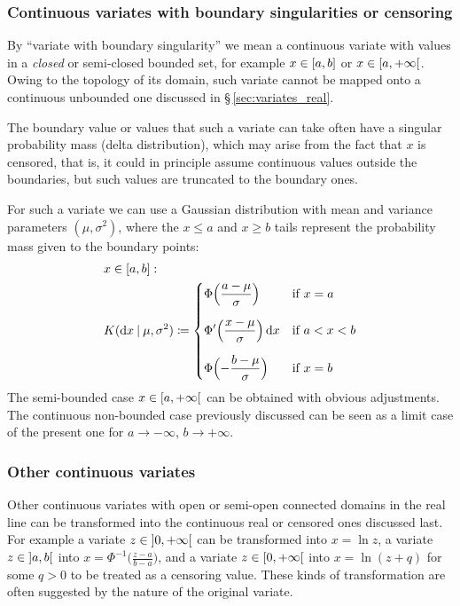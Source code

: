 \documentclass[\ifafour a4paper,12pt,\else a5paper,10pt,\fi%
onecolumn,oneside,article,%
british%
]{memoir}
\theoremstyle{remark}
\theoremstyle{innote}
\newcommand*{\di}{\mathrm{d}}%
\newcommand*{\defd}{\coloneqq}
\renewcommand*{\le}{\leqslant}%
\renewcommand*{\ge}{\geqslant}%
\DeclarePairedDelimiter\clcl{[}{]}
\DeclarePairedDelimiter\clop{[}{[}
\DeclarePairedDelimiter\opop{]}{[}%
\renewcommand*{\|}[1][]{\nonscript\:#1\vert\nonscript\:\mathopen{}}
\newcommand*{\sect}{\S}%
\begin{document}
\subsubsection{Continuous variates with boundary singularities or censoring}
\label{sec:variates_censored}

By \enquote{variate with boundary singularity} we mean a continuous variate with values in a \emph{closed} or semi-closed bounded set, for example $x \in \clcl{a,b}$ or $x \in \clop{a,+\infty}$. Owing to the topology of its domain, such variate cannot be mapped onto a continuous unbounded one discussed in \sect\,\ref{sec:variates_real}.

The boundary value or values that such a variate can take often have a singular probability mass (delta distribution), which may arise from the fact that $x$ is censored, that is, it could in principle assume continuous values outside the boundaries, but such values are truncated to the boundary ones.

For such a variate we can use a Gaussian distribution with mean and variance parameters $(\mu,\sigma^{2})$, where the $x \le a$ and $x \ge b$ tails represent the probability mass given to the boundary points:
\begin{equation}
  \begin{split}
    \label{eq:K_cens}
    &x \in \clcl{a,b}:
    \\
    &K(\di x \| \mu, \sigma^{2}) \defd
    \begin{dcases}
        \Phi\Bigl(
  \frac{a - \mu}{\sigma}
  \Bigr)
  &\text{if $x=a$}
      \\[2\jot]
        \Phi'\Bigl(
  \frac{x - \mu}{\sigma}
  \Bigr)
  \, \di x
  &\text{if $a < x < b$}
      \\[2\jot]
        \Phi\Bigl(
  -\frac{b - \mu}{\sigma}
  \Bigr)
  &\text{if $x=b$}
    \end{dcases}
  \end{split}
\end{equation}
The semi-bounded case $x \in \clop{a,+\infty}$ can be obtained with obvious adjustments. The continuous non-bounded case previously discussed can be seen as a limit case of the present one for $a\to -\infty$, $b\to +\infty$.

\subsubsection{Other continuous variates}
\label{sec:variates_other}

Other continuous variates with open or semi-open connected domains in the real line can be transformed into the continuous real or censored ones discussed last. For example a variate $z \in \opop{0, +\infty}$ can be transformed into $x=\ln z$, a variate $z \in \opop{a,b}$ into $x=\Phi^{-1}\bigl(\frac{z-a}{b-a}\bigr)$, and a variate $z \in \clop{0, +\infty}$ into $x=\ln(z+q)$ for some $q > 0$ to be treated as a censoring value. These kinds of transformation are often suggested by the nature of the original variate.
\end{document}
